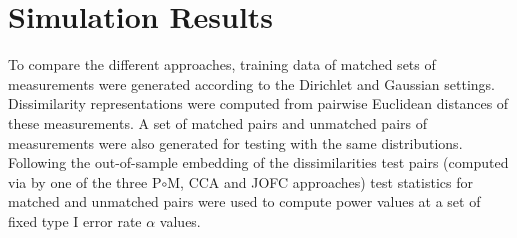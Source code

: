 \documentclass[11pt]{article} %
\begin{document}

\section{Simulation Results\label{sec:Simulation Results}}
To compare the  different approaches, training data of matched sets of measurements were generated according to the Dirichlet and Gaussian settings. Dissimilarity representations were computed from pairwise Euclidean distances of these measurements. A set of matched pairs and unmatched pairs of measurements were also generated for testing with the same distributions. Following the out-of-sample embedding of the dissimilarities test pairs (computed via by one of the three P$\circ $M, CCA and JOFC approaches)  test statistics  for matched and unmatched pairs were used to compute power values at a set of fixed type I error rate $\alpha$ values.
\end{document}
